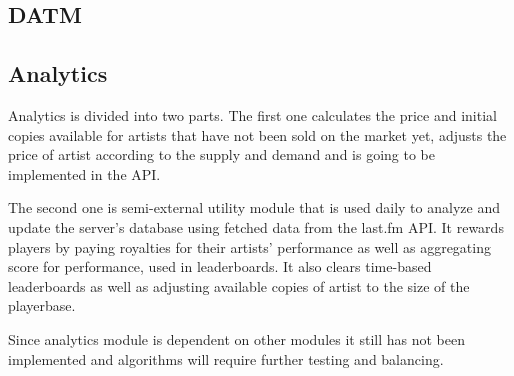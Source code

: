\documentclass[a4paper,10pt,twoside]{article}
\begin{document}
\subsection{DATM}
\subsection{Analytics}
Analytics is divided into two parts. The first one calculates the price and initial copies available for artists that have not been sold on the market yet, adjusts the price of artist according to the supply and demand and is going to be implemented in the API.

The second one is semi-external utility module that is used daily to analyze and update the server's database using fetched data from the last.fm API. It rewards players by paying royalties for their artists' performance as well as aggregating score for performance, used in leaderboards. It also clears time-based leaderboards as well as adjusting available copies of artist to the size of the playerbase.

Since analytics module is dependent on other modules it still has not been implemented and algorithms will require further testing and balancing.
\end{document}
